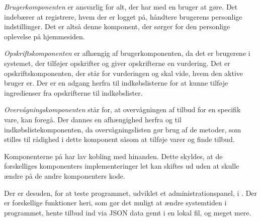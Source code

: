 \textit{Brugerkomponenten} er ansvarlig for alt, der har med en bruger at gøre. 
Det indebærer at registrere, hvem der er logget på, håndtere brugerens personlige indstillinger. 
Det er altså denne komponent, der sørger for den personlige oplevelse på hjemmesiden.

\textit{Opskriftskomponenten} er afhængig af brugerkomponenten, da det er brugerene i systemet, der tilføjer opskrifter og giver opskrifterne en vurdering.
Det er opskriftskomponenten, der står for vurderingen og skal vide, hvem den aktive bruger er.
Der er en adgang herfra til indkøbslisterne for at kunne tilføje ingredienser fra opskrifterne til indkøbslister.

\textit{Overvågningskomponenten} står for, at overvågningen af tilbud for en specifik vare, kan foregå.
Der dannes en afhængighed herfra og til indkøbslistekomponenten, da overvågningslisten gør brug af de metoder, som stilles til rådighed i dette komponent såsom at tilføje varer og finde tilbud.

Komponenterne på  har lav kobling med hinanden.
Dette skyldes, at de forskelliges komponenters implementeringer let kan skiftes ud uden at skulle ændre på de andre komponenters kode.

Der er desuden, for at teste programmet, udviklet et administrationspanel, i . 
Der er forskellige funktioner heri, som gør det muligt at ændre systemtiden i programmet, hente tilbud ind via JSON data gemt i en lokal fil, og meget mere.


